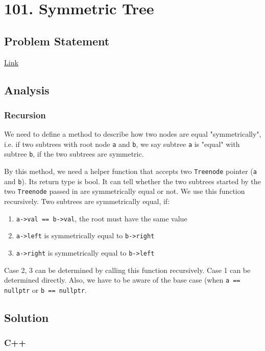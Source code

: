\documentclass[12pt]{article}
\begin{document}
\section{101. Symmetric Tree}
\label{sec:orgfa8b4e5}
\subsection{Problem Statement}
\label{sec:orga040947}
\href{https://leetcode.com/problems/symmetric-tree/}{Link}
\subsection{Analysis}
\label{sec:org8c117f0}
\subsubsection{Recursion}
\label{sec:org85fb143}
We need to define a method to describe how two nodes are equal "symmetrically", i.e. if two subtrees with root node \texttt{a} and \texttt{b}, we say subtree \texttt{a} is "equal" with subtree \texttt{b}, if the two subtrees are symmetric.

By this method, we need a helper function that accepts two \texttt{Treenode} pointer (\texttt{a} and \texttt{b}). Its return type is bool. It can tell whether the two subtrees started by the two \texttt{Treenode} passed in are symmetrically equal or not. We use this function recursively. Two subtrees are symmetrically equal, if:
\begin{enumerate}
\item \texttt{a->val == b->val}, the root must have the same value
\item \texttt{a->left} is symmetrically equal to \texttt{b->right}
\item \texttt{a->right} is symmetrically equal to \texttt{b->left}
\end{enumerate}
Case 2, 3 can be determined by calling this function recursively. Case 1 can be determined directly. Also, we have to be aware of the base case (when \texttt{a == nullptr} or \texttt{b == nullptr}.

\subsection{Solution}
\label{sec:org6ac7d56}
\subsubsection{C++}
\label{sec:orgefd9101}
\end{document}
